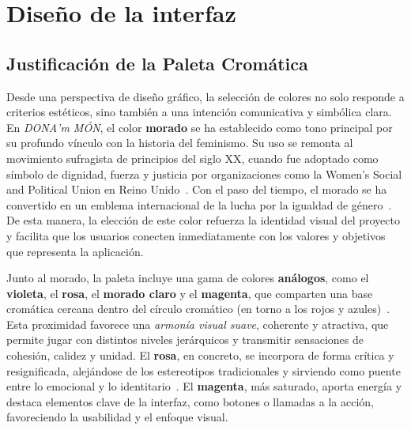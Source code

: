 


\section{Diseño de la interfaz}

\subsection{Justificación de la Paleta Cromática}

Desde una perspectiva de diseño gráfico, la selección de colores no solo responde a criterios estéticos, sino también a una intención comunicativa y simbólica clara. En \textit{DONA'm MÓN}, el color \textbf{morado} se ha establecido como tono principal por su profundo vínculo con la historia del feminismo. Su uso se remonta al movimiento sufragista de principios del siglo XX, cuando fue adoptado como símbolo de dignidad, fuerza y justicia por organizaciones como la Women's Social and Political Union en Reino Unido~\cite{unwomen2023, cochrane2013}. Con el paso del tiempo, el morado se ha convertido en un emblema internacional de la lucha por la igualdad de género~\cite{unwomen2023}. De esta manera, la elección de este color refuerza la identidad visual del proyecto y facilita que los usuarios conecten inmediatamente con los valores y objetivos que representa la aplicación.

Junto al morado, la paleta incluye una gama de colores \textbf{análogos}, como el \textbf{violeta}, el \textbf{rosa}, el \textbf{morado claro} y el \textbf{magenta}, que comparten una base cromática cercana dentro del círculo cromático (en torno a los rojos y azules)~\cite{molina2010}. Esta proximidad favorece una \textit{armonía visual suave}, coherente y atractiva, que permite jugar con distintos niveles jerárquicos y transmitir sensaciones de cohesión, calidez y unidad. El \textbf{rosa}, en concreto, se incorpora de forma crítica y resignificada, alejándose de los estereotipos tradicionales y sirviendo como puente entre lo emocional y lo identitario~\cite{eiseman2000}. El \textbf{magenta}, más saturado, aporta energía y destaca elementos clave de la interfaz, como botones o llamadas a la acción, favoreciendo la usabilidad y el enfoque visual.

